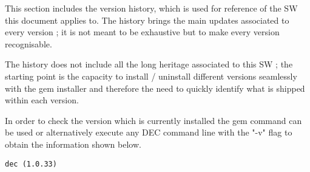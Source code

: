 \documentclass[dec_sum_main.tex]{subfiles}
\begin{document}
 
\par
\noindent
This section includes the version history, which is used for reference of the SW this document applies to. The history brings the main updates associated to every version ; it is not meant to be exhaustive but to make every version recognisable.\newline

\par
\noindent
The history does not include all the long heritage associated to this SW ; the starting point is the capacity to install / uninstall different versions seamlessly with the gem installer and therefore the need to quickly identify what is shipped within each version. \newline

\par
\noindent 
In order to check the version which is currently installed the gem command can be used or alternatively execute any DEC command line with the "-v" flag to obtain the information shown below. \newline


\begin{Verbatim}[tabsize=4]
    dec (1.0.33)
\end{Verbatim}

\end{document}
